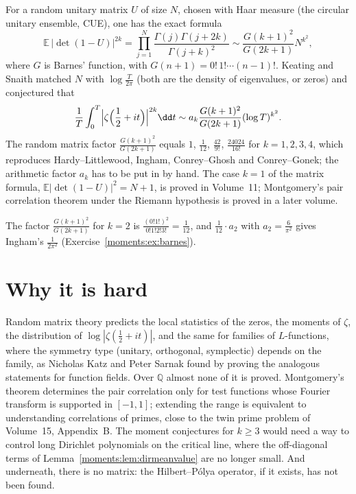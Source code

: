 \begin{remark}\label{moments:rem:keatingsnaith}
For a random unitary matrix $U$ of size $N$, chosen with Haar measure (the circular unitary ensemble, CUE), one has the exact formula
\[
\mathbb E\,|\det(1-U)|^{2k}=\prod_{j=1}^N\frac{\Gamma(j)\Gamma(j+2k)}{\Gamma(j+k)^2}\sim\frac{G(k+1)^2}{G(2k+1)}N^{k^2},
\]
where $G$ is Barnes' function, with $G(n+1)=0!\,1!\cdots(n-1)!$. Keating and Snaith matched $N$ with $\log\frac T{2\pi}$ (both are the density of
eigenvalues, or zeros) and conjectured that
\[
\frac1T\int_0^T\Bigl|\zeta\Bigl(\frac12+it\Bigr)\Bigr|^{2k}\dd t\sim a_k\frac{G(k+1)^2}{G(2k+1)}(\log T)^{k^2}.
\]
The random matrix factor $\frac{G(k+1)^2}{G(2k+1)}$ equals $1$, $\frac1{12}$, $\frac{42}{9!}$, $\frac{24024}{16!}$ for $k=1,2,3,4$, which reproduces Hardy--Littlewood,
Ingham, Conrey--Ghosh and Conrey--Gonek; the arithmetic factor $a_k$ has to be put in by hand. The case $k=1$ of the matrix formula, $\mathbb E|\det(1-U)|^2=N+1$,
is proved in Volume~11; Montgomery's pair correlation theorem under the Riemann hypothesis is proved in a later volume.
\end{remark}

The factor $\frac{G(k+1)^2}{G(2k+1)}$ for $k=2$ is $\frac{(0!1!)^2}{0!1!2!3!}=\frac1{12}$, and $\frac1{12}\cdot a_2$ with $a_2=\frac6{\pi^2}$ gives Ingham's
$\frac1{2\pi^2}$ (Exercise~\ref{moments:ex:barnes}).

\section{Why it is hard}

Random matrix theory predicts the local statistics of the zeros, the moments of $\zeta$, the distribution of $\log|\zeta(\frac12+it)|$, and the same
for families of $L$-functions, where the symmetry type (unitary, orthogonal, symplectic) depends on the family, as Nicholas Katz and Peter Sarnak found by
proving the analogous statements for function fields. Over $\mathbb Q$ almost none of it is proved. Montgomery's theorem determines the pair correlation only
for test functions whose Fourier transform is supported in $[-1,1]$; extending the range is equivalent to understanding correlations of primes, close to
the twin prime problem of Volume~15, Appendix~B. The moment conjectures for $k\ge3$ would need a way to control long Dirichlet polynomials on the
critical line, where the off-diagonal terms of Lemma~\ref{moments:lem:dirmeanvalue} are no longer small. And underneath, there is no matrix: the
Hilbert--P\'olya operator, if it exists, has not been found.

